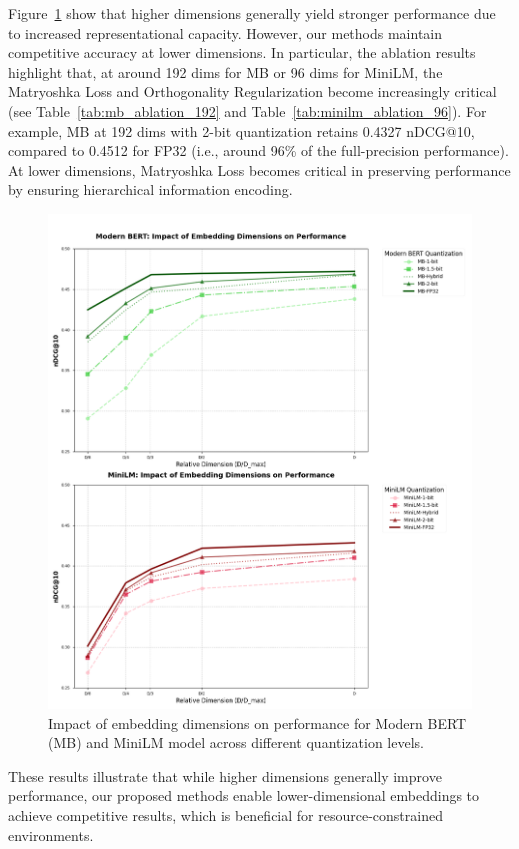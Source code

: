 Figure~\ref{fig:dimension_impact_mb} show that higher dimensions generally yield stronger performance due to increased representational capacity. However, our methods maintain competitive accuracy at lower dimensions.
In particular, the ablation results highlight that, at around 192 dims for MB or 96 dims for MiniLM, the Matryoshka Loss and Orthogonality Regularization become increasingly critical (see Table~\ref{tab:mb_ablation_192} and Table~\ref{tab:minilm_ablation_96}). 
For example, MB at 192 dims with 2-bit quantization retains 0.4327 nDCG@10, compared to 0.4512 for FP32 (i.e., around 96\% of the full-precision performance). 
At lower dimensions, Matryoshka Loss becomes critical in preserving performance by ensuring hierarchical information encoding.
\begin{figure}[ht]
    \centering
    \includegraphics[width=0.8\linewidth]{result_fig_1.png}
    \caption{Impact of embedding dimensions on performance for Modern BERT (MB) and MiniLM model across different quantization levels.}
    \label{fig:dimension_impact_mb}
\end{figure}
These results illustrate that while higher dimensions generally improve performance, our proposed methods enable lower-dimensional embeddings to achieve competitive results, which is beneficial for resource-constrained environments.


